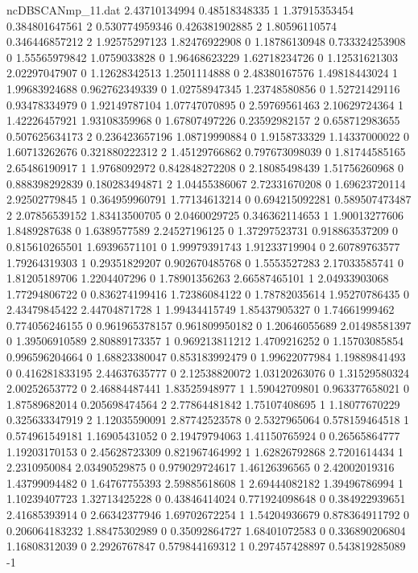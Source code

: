 \begin{filecontents}{ncDBSCANmp_11.dat}
2.43710134994 0.48518348335 1
1.37915353454 0.384801647561 2
0.530774959346 0.426381902885 2
1.80596110574 0.346446857212 2
1.92575297123 1.82476922908 0
1.18786130948 0.733324253908 0
1.55565979842 1.0759033828 0
1.96468623229 1.62718234726 0
1.12531621303 2.02297047907 0
1.12628342513 1.2501114888 0
2.48380167576 1.49818443024 1
1.99683924688 0.962762349339 0
1.02758947345 1.23748580856 0
1.52721429116 0.93478334979 0
1.92149787104 1.07747070895 0
2.59769561463 2.10629724364 1
1.42226457921 1.93108359968 0
1.67807497226 0.23592982157 2
0.658712983655 0.507625634173 2
0.236423657196 1.08719990884 0
1.9158733329 1.14337000022 0
1.60713262676 0.321880222312 2
1.45129766862 0.797673098039 0
1.81744585165 2.65486190917 1
1.9768092972 0.842848272208 0
2.18085498439 1.51756260968 0
0.888398292839 0.180283494871 2
1.04455386067 2.72331670208 0
1.69623720114 2.92502779845 1
0.364959960791 1.77134613214 0
0.694215092281 0.589507473487 2
2.07856539152 1.83413500705 0
2.0460029725 0.346362114653 1
1.90013277606 1.8489287638 0
1.6389577589 2.24527196125 0
1.37297523731 0.918863537209 0
0.815610265501 1.69396571101 0
1.99979391743 1.91233719904 0
2.60789763577 1.79264319303 1
0.29351829207 0.902670485768 0
1.5553527283 2.17033585741 0
1.81205189706 1.2204407296 0
1.78901356263 2.66587465101 1
2.04933903068 1.77294806722 0
0.836274199416 1.72386084122 0
1.78782035614 1.95270786435 0
2.43479845422 2.44704871728 1
1.99434415749 1.85437905327 0
1.74661999462 0.774056246155 0
0.961965378157 0.961809950182 0
1.20646055689 2.01498581397 0
1.39506910589 2.80889173357 1
0.969213811212 1.4709216252 0
1.15703085854 0.996596204664 0
1.68823380047 0.853183992479 0
1.99622077984 1.19889841493 0
0.416281833195 2.44637635777 0
2.12538820072 1.03120263076 0
1.31529580324 2.00252653772 0
2.46884487441 1.83525948977 1
1.59042709801 0.963377658021 0
1.87589682014 0.205698474564 2
2.77864481842 1.75107408695 1
1.18077670229 0.325633347919 2
1.12035590091 2.87742523578 0
2.5327965064 0.578159464518 1
0.574961549181 1.16905431052 0
2.19479794063 1.41150765924 0
0.26565864777 1.19203170153 0
2.45628723309 0.821967464992 1
1.62826792868 2.7201614434 1
2.2310950084 2.03490529875 0
0.979029724617 1.46126396565 0
2.42002019316 1.43799094482 0
1.64767755393 2.59885618608 1
2.69444082182 1.39496786994 1
1.10239407723 1.32713425228 0
0.43846414024 0.771924098648 0
0.384922939651 2.41685393914 0
2.66342377946 1.69702672254 1
1.54204936679 0.878364911792 0
0.206064183232 1.88475302989 0
0.35092864727 1.68401072583 0
0.336890206804 1.16808312039 0
2.2926767847 0.579844169312 1
0.297457428897 0.543819285089 -1

\end{filecontents}
